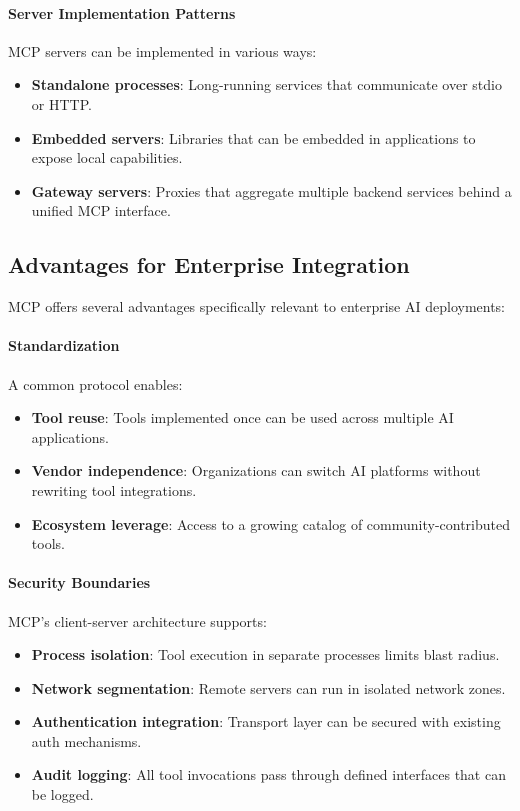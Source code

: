 \paragraph{Server Implementation Patterns}

MCP servers can be implemented in various ways:

\begin{itemize}
    \item \textbf{Standalone processes}: Long-running services that communicate over stdio or HTTP.
    \item \textbf{Embedded servers}: Libraries that can be embedded in applications to expose local capabilities.
    \item \textbf{Gateway servers}: Proxies that aggregate multiple backend services behind a unified MCP interface.
\end{itemize}

\subsection{Advantages for Enterprise Integration}

MCP offers several advantages specifically relevant to enterprise AI deployments:

\paragraph{Standardization}

A common protocol enables:
\begin{itemize}
    \item \textbf{Tool reuse}: Tools implemented once can be used across multiple AI applications.
    \item \textbf{Vendor independence}: Organizations can switch AI platforms without rewriting tool integrations.
    \item \textbf{Ecosystem leverage}: Access to a growing catalog of community-contributed tools.
\end{itemize}

\paragraph{Security Boundaries}

MCP's client-server architecture supports:
\begin{itemize}
    \item \textbf{Process isolation}: Tool execution in separate processes limits blast radius.
    \item \textbf{Network segmentation}: Remote servers can run in isolated network zones.
    \item \textbf{Authentication integration}: Transport layer can be secured with existing auth mechanisms.
    \item \textbf{Audit logging}: All tool invocations pass through defined interfaces that can be logged.
\end{itemize}

